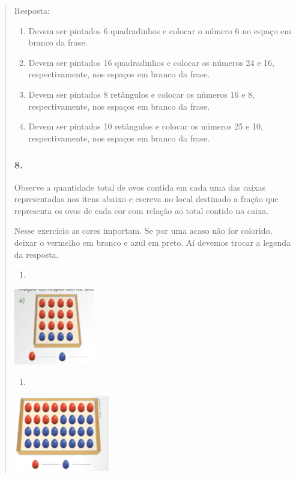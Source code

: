 \begin{enumerate}
\begin{escolha}
\begin{enumerate}
\begin{itemize}
\begin{itemize}
\begin{escolha}
\begin{quote}
\begin{escolha}
{Resposta:

\begin{enumerate}
\def\labelenumi{\alph{enumi})}
\item
  Devem ser pintados 6 quadradinhos e colocar o número 6 no espaço em
  branco da frase.
\item
  Devem ser pintados 16 quadradinhos e colocar os números 24 e 16,
  respectivamente, nos espaços em branco da frase.
\item
  Devem ser pintados 8 retângulos e colocar os números 16 e 8,
  respectivamente, nos espaços em branco da frase.
\item
  Devem ser pintados 10 retângulos e colocar os números 25 e 10,
  respectivamente, nos espaços em branco da frase.
\end{enumerate}

\subsubsection{8.}\label{section-111}

Observe a quantidade total de ovos contida em cada uma das caixas
representadas nos itens abaixo e escreva no local destinado a fração que
representa os ovos de cada cor com relação ao total contido na caixa.

Nesse exercício as cores importam. Se por uma acaso não for colorido,
deixar o vermelho em branco e azul em preto. Aí devemos trocar a legenda
da resposta.

\begin{enumerate}
\def\labelenumi{\alph{enumi})}
\item
\end{enumerate}

\includegraphics[width=1.37512in,height=1.31678in]{media/image118.png}

\begin{enumerate}
\def\labelenumi{\alph{enumi})}
\item
\end{enumerate}

\includegraphics[width=1.64181in,height=1.30845in]{media/image119.png}

}
\end{escolha}
\end{quote}
\end{escolha}
\end{itemize}
\end{itemize}
\end{enumerate}
\end{escolha}
\end{enumerate}
